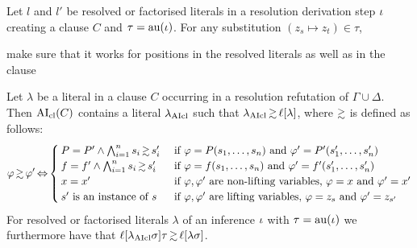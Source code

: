 \documentclass[,%
	draft=false,%
	numbers=noendperiod
	11pt,
	a4paper,
	oneside,%
	openany,
]{memoir}
\begin{document}
\begin{lemma}
	Let $l$ and $l'$ be resolved or factorised literals in a resolution derivation step $\iota$ creating a clause $C$ and
	$\tau = \operatorname{au}(\iota)$.
	For any substitution $(z_s \mapsto z_t) \in \tau$,





	make sure that it works for positions in the resolved literals as well as in the clause


\end{lemma}

\begin{lemma}
	\label{lemma:literals_clause_simgeq}
	Let $\lambda$ be a literal in a clause $C$ occurring in a resolution refutation of $\Gamma\cup\Delta$.
	Then $\operatorname{AI}_\mathrm{cl}(C)$ contains a literal $\lambda_{\operatorname{AIcl}}$ such that $\lambda\cl \simgeq \lifboth{\lambda}$, where $\simgeq$ is defined as follows:
	\[
		\varphi \simgeq \varphi' \semiff
		\begin{cases}
			P = P' \land \bigwedge_{i=1}^n s_i \simgeq s'_i &  \text{ if $\varphi = P(s_1, \dots, s_n)$ and $\varphi' = P'(s'_1, \dots, s'_n)$} \\
			f = f' \land \bigwedge_{i=1}^n s_i \simgeq s'_i &  \text{ if $\varphi = f(s_1, \dots, s_n)$ and $\varphi' = f'(s'_1, \dots, s'_n)$} \\
			x = x' & \text{ if $\varphi, \varphi'$ are non-lifting variables, $\varphi = x$ and $\varphi' = x'$} \\
			s' \text{ is an instance of } s  & \text{ if $\varphi, \varphi'$ are lifting variables, $\varphi = z_s$ and $\varphi' = z_{s'}$} \\
		\end{cases}
	\]
	For resolved or factorised literals $\lambda$ of an inference $\iota$ with $\tau = \operatorname{au}(\iota)$ we furthermore have that $\lifboth{\lambda\cl\sigma}\tau \simgeq \lifboth{\lambda\sigma}$.
\end{lemma}
\end{document}
